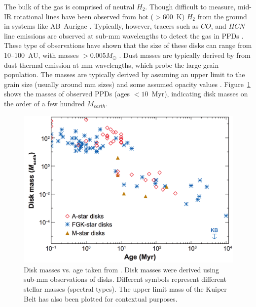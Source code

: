     The bulk of the gas is comprised of neutral $H_2$. Though difficult to measure, mid-IR rotational lines have been observed from hot ($>600$~K) $H_2$ from the ground in systems like AB~Aurigae \citep{Bitner2007}. Typically, however, tracers such as $CO$, and $HCN$ line emissions are observed at sub-mm wavelengths to detect the gas in PPDs \citep[e.g., for stars in young associations such as Ophiuchus and Taurus-Auriga,][respectively]{Andre1994,Beckwith1990}. These type of observations have shown that the size of these disks can range from 10--100~AU, with masses $>0.005M_\odot$ \citep{Osterloh1995}. Dust masses are typically derived by from dust thermal emission at mm-wavelengths, which probe the large grain population. The masses are typically derived by assuming an upper limit to the grain size (usually around mm sizes) and some assumed opacity values \citep{Beckwith1990}. Figure~\ref{fig:disk_masses} shows the masses of observed PPDs (ages $<10$~Myr), indicating disk masses on the order of a few hundred $M_{earth}$. 
    
    \begin{figure}
    \centering
    \includegraphics[width=.8\textwidth]{Ch1/diskmass_age_wyatt2008} 
    \caption[Protoplanetary and Debris Disk Masses Over Time]{Disk masses vs. age taken from \citet{Wyatt2008}. Disk masses were derived using sub-mm observations of disks. Different symbols represent different stellar masses (spectral types). The upper limit mass of the Kuiper Belt has also been plotted for contextual purposes.}
    \label{fig:disk_masses}
    \end{figure}
    
